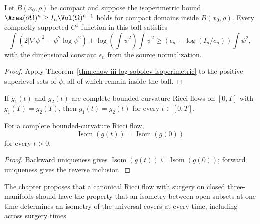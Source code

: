 \begin{theorem}
\label{thm:chow-iii-local-log-sobolev}
Let \(\overline B(x_0,\rho)\) be compact and suppose the isoperimetric bound
\(\Area(\partial\Omega)^n\ge I_n\Vol(\Omega)^{n-1}\) holds for compact domains
inside \(B(x_0,\rho)\).  Every compactly supported \(C^1\) function in this ball
satisfies
\[
 \int(2|\nabla\psi|^2-\psi^2\log\psi^2)
 +\log\!\left(\int\psi^2\right)\int\psi^2
 \ge\left(\epsilon_n+\log(I_n/c_n)\right)\int\psi^2,
\]
with the dimensional constant \(\epsilon_n\) from the source normalization.
\end{theorem}
\begin{proof}
\sketch Apply Theorem~\ref{thm:chow-iii-log-sobolev-isoperimetric} to the
positive superlevel sets of \(\psi\), all of which remain inside the ball.
\end{proof}

\begin{theorem}
\label{thm:chow-iii-backward-uniqueness}
If \(g_1(t)\) and \(g_2(t)\) are complete bounded-curvature Ricci flows on
\([0,T]\) with \(g_1(T)=g_2(T)\), then \(g_1(t)=g_2(t)\) for every
\(t\in[0,T]\).
\end{theorem}

\begin{corollary}
\label{cor:chow-iii-isometry-group-preserved}
For a complete bounded-curvature Ricci flow,
\[
 \operatorname{Isom}(g(t))=\operatorname{Isom}(g(0))
\]
for every \(t>0\).
\end{corollary}
\begin{proof}
\sketch Backward uniqueness gives \(\operatorname{Isom}(g(t))\subseteq\operatorname{Isom}(g(0))\);
forward uniqueness gives the reverse inclusion.
\end{proof}

\begin{remark}
\label{rem:chow-iii-canonical-surgery-criterion}
The chapter proposes that a canonical Ricci flow with surgery on closed
three-manifolds should have the property that an isometry between open subsets
at one time determines an isometry of the universal covers at every time,
including across surgery times.
\end{remark}
